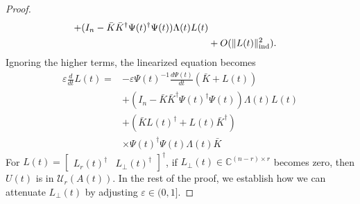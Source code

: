 \documentclass[fleqn,10pt]{SICE_FES26}
\begin{document}
\begin{proof}
\begin{align*}
	+ ( I_{n} - \bar{K} \bar{K} ^{\dagger} \Psi (t)^{\dagger} \Psi (t)  ) \Lambda (t) L(t) 
	\\
	&
	+ O(\| L(t) \| _{\rm ind}^{2}). 
	\end{align*}
	Ignoring the higher terms, the linearized equation becomes 
	\begin{align*}
	\varepsilon \frac{d}{dt} L (t)  
	=&
	- \varepsilon \Psi (t) ^{-1} \frac{d\Psi (t)}{dt} (\bar{K} + L (t) )
	\\
	& + (I_{n} - \bar{K} \bar{K}^{\dagger} \Psi (t) ^{\dagger} \Psi (t) ) \Lambda (t) L(t) 
	\\
	& + 
	(\bar{K}  L(t)^{\dagger} + L (t) \bar{K}^{\dagger} )
	\\ & \times  \Psi (t)^{\dagger} \Psi (t) \Lambda (t) \bar{K}
	\end{align*}
	For $L(t) = \begin{bmatrix} L_{r}(t)^{\dagger}  & L_{\perp}(t)^{\dagger}  \end{bmatrix} ^{\dagger}$, if $L_{\perp} (t) \in {\mathbb{C}}^{(n-r)\times r}$ becomes zero, then $U(t)$ is in ${\mathcal{U}}_{r}(A(t))$. 
	In the rest of the proof, we establish how we can attenuate $L_{\perp}(t)$ by adjusting $\varepsilon \in (0,1]$. 
	

\end{proof}
\end{document}
